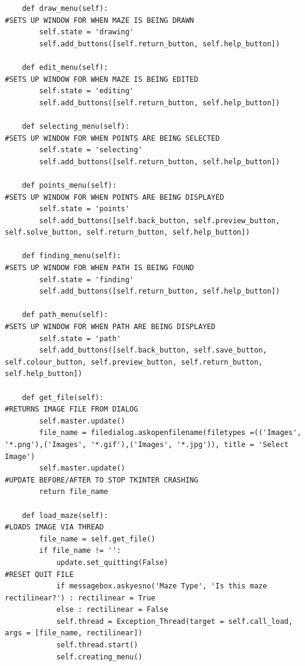 \documentclass[titlepage]{article}
\begin{document}
\begin{changemargin}{-1in}{-1in}
\begin{verbatim}
    def draw_menu(self):                                                        #SETS UP WINDOW FOR WHEN MAZE IS BEING DRAWN 
        self.state = 'drawing'
        self.add_buttons([self.return_button, self.help_button])

    def edit_menu(self):                                                        #SETS UP WINDOW FOR WHEN MAZE IS BEING EDITED  
        self.state = 'editing'
        self.add_buttons([self.return_button, self.help_button])

    def selecting_menu(self):                                                   #SETS UP WINDOW FOR WHEN POINTS ARE BEING SELECTED 
        self.state = 'selecting'
        self.add_buttons([self.return_button, self.help_button])

    def points_menu(self):                                                      #SETS UP WINDOW FOR WHEN POINTS ARE BEING DISPLAYED 
        self.state = 'points'
        self.add_buttons([self.back_button, self.preview_button, self.solve_button, self.return_button, self.help_button])
    
    def finding_menu(self):                                                     #SETS UP WINDOW FOR WHEN PATH IS BEING FOUND 
        self.state = 'finding'
        self.add_buttons([self.return_button, self.help_button])

    def path_menu(self):                                                        #SETS UP WINDOW FOR WHEN PATH ARE BEING DISPLAYED 
        self.state = 'path'
        self.add_buttons([self.back_button, self.save_button, self.colour_button, self.preview_button, self.return_button, self.help_button])

    def get_file(self):                                                         #RETURNS IMAGE FILE FROM DIALOG
        self.master.update()                                                
        file_name = filedialog.askopenfilename(filetypes =(('Images', '*.png'),('Images', '*.gif'),('Images', '*.jpg')), title = 'Select Image')
        self.master.update()                                                    #UPDATE BEFORE/AFTER TO STOP TKINTER CRASHING
        return file_name

    def load_maze(self):                                                        #LOADS IMAGE VIA THREAD
        file_name = self.get_file()
        if file_name != '':
            update.set_quitting(False)                                          #RESET QUIT FILE
            if messagebox.askyesno('Maze Type', 'Is this maze rectilinear?') : rectilinear = True
            else : rectilinear = False
            self.thread = Exception_Thread(target = self.call_load, args = [file_name, rectilinear])
            self.thread.start()
            self.creating_menu()


\end{verbatim}
\end{changemargin}
\end{document}
